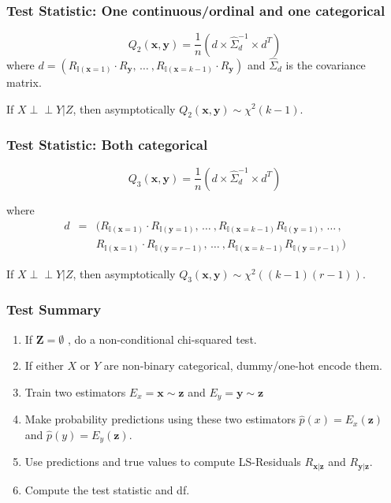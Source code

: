 \documentclass{beamer}
\def\ci{\perp\!\!\!\!\!\perp}
\begin{document}
\begin{frame}
	\frametitle{Test Statistic: One continuous/ordinal and one categorical}
	$$ Q_2(\bm{x}, \bm{y}) = \frac{1}{n} (d \times \hat{\Sigma}_d^{-1} \times d^T) $$
	where $ d = (R_{\mathbb{I}(\mathbf{x}=1)} \cdot R_{\mathbf{y}}, \, \ldots \ ,
		R_{\mathbb{I}(\mathbf{x}=k-1)} \cdot R_{\mathbf{y}})$ and $ \hat{\Sigma}_d $ is the covariance matrix.

	\vspace{1em}
	\begin{center}
		If $ X \ci Y | Z $, then asymptotically $ Q_2(\bm{x}, \bm{y}) \sim \chi^2(k-1) $.
	\end{center}


\end{frame}

\begin{frame}
	\frametitle{Test Statistic: Both categorical}

	$$ Q_3(\bm{x}, \bm{y}) = \frac{1}{n} (d \times \hat{\Sigma}_d^{-1} \times d^T) $$

	where 
	\begin{eqnarray*}
		d &  =  & (R_{\mathbb{I}(\mathbf{x}=1)} \cdot R_{\mathbb{I}(\mathbf{y}=1)}, \, \ldots \ ,
		R_{\mathbb{I}(\mathbf{x}=k-1)} R_{\mathbb{I}(\mathbf{y}=1)}, \, \ldots \, ,
		\\
	 	& & R_{\mathbb{I}(\mathbf{x}=1)} \cdot R_{\mathbb{I}(\mathbf{y}=r-1)}, \, \ldots \ ,
		R_{\mathbb{I}(\mathbf{x}=k-1)} R_{\mathbb{I}(\mathbf{y}=r-1)}
		)
	\end{eqnarray*}
	\vspace{1em}

	\begin{center}
	If $ X \ci Y | Z $, then asymptotically $ Q_3(\bm{x}, \bm{y}) \sim \chi^2((k-1)(r-1)) $.
	\end{center}

\end{frame}

\begin{frame}
	\frametitle{Test Summary}
	\begin{enumerate}
		\setlength\itemsep{1em}
		\item If $\mathbf{Z} = \emptyset $ , do a non-conditional chi-squared test.
		\item If either $ X $ or $ Y $ are non-binary categorical,
			dummy/one-hot encode them.
		\item Train two estimators $ E_x = \bm{x} \sim \bm{z} $ and
			$ E_y = \bm{y} \sim \bm{z} $
		\item Make probability predictions using these two estimators 
			$ \hat{p}(x) = E_x(\bm{z}) $ and $ \hat{p}(y) =
			E_y(\bm{\bm{z}}) $.
		\item Use predictions and true values to compute LS-Residuals $ R_{\bm{x}|\bm{z}} $ and $ R_{\bm{y}|\bm{z}} $.	
		\item Compute the test statistic and df.
	\end{enumerate}
\end{frame}
\end{document}
